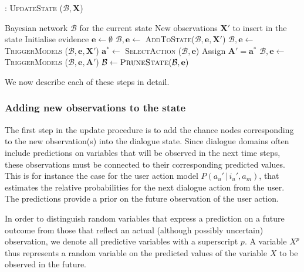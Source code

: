 \begin{algorithm}[ht]
\caption{: \textsc{UpdateState} ($\mathcal{B}, \mathbf{X}$)}
\begin{algorithmic}[1] \vspace{1mm}
\REQUIRE Bayesian network $\mathcal{B}$ for the current state
\REQUIRE New observations $\mathbf{X}'$ to insert in the state \vspace{1mm}
\STATE Initialise evidence $\mathbf{e} \leftarrow \emptyset$
\STATE $\mathcal{B}, \mathbf{e} \leftarrow $ \textsc{AddToState}($\mathcal{B}, \mathbf{e}, \mathbf{X}'$)
\STATE $\mathcal{B}, \mathbf{e} \leftarrow$ \textsc{TriggerModels} ($\mathcal{B}, \mathbf{e},  \mathbf{X}'$) \vspace{1mm}
\STATE $\mathbf{a}^* \leftarrow $ \textsc{SelectAction} ($\mathcal{B}, \mathbf{e}$)
\STATE Assign $\mathbf{A}' = \mathbf{a}^*$
\STATE $\mathcal{B}, \mathbf{e} \leftarrow$ \textsc{TriggerModels} ($\mathcal{B}, \mathbf{e}, \mathbf{A}'$)
\ENDWHILE \vspace{1mm}
\STATE $\mathcal{B} \leftarrow \textsc{PruneState} (\mathcal{B}, \mathbf{e})$ \vspace{1mm}
\end{algorithmic}
\label{algo:stateupdate}
\end{algorithm}

We now describe each of these steps in detail.

\subsubsection*{Adding new observations to the state}

The first step in the update procedure is to add the chance nodes corresponding to the new observation(s) into the dialogue state. Since dialogue domains often include predictions on variables that will be observed in the next time steps, these observations must be connected to their corresponding predicted values. This is for instance the case for the user action model $P(a_u' \, | \, i_u', a_m)$, that estimates the relative probabilities for the next dialogue action from the user. The predictions provide a prior on the future observation of the user action. 

In order to distinguish random variables that express a prediction on a future outcome from those that reflect an actual (although possibly uncertain) observation, we denote all predictive variables with a superscript $p$. A variable $X^p$ thus represents a random variable on the predicted values of the variable $X$ to be observed in the future. 



